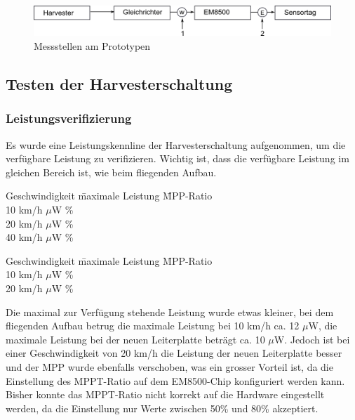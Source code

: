 \begin{figure}[ht]
  \includegraphics[width=1.0\textwidth]{3Vorgehen/imag/EnergiemessungStellen.png}               
  \caption{Messstellen am Prototypen}
  \label{EnergieMessungStellen} 
\end{figure}

\subsection{Testen der Harvesterschaltung}
\label{glace}

\subsubsection{Leistungsverifizierung}
\label{leistungsverifizierung}

Es wurde eine Leistungskennline der Harvesterschaltung aufgenommen, um die verfügbare Leistung zu verifizieren. Wichtig ist, dass die verfügbare Leistung im gleichen Bereich ist, wie beim fliegenden Aufbau. 

\begin{minipage}{1\textwidth}
\label{tab:leistung_fliegenden-aufbaus} 
\begin{tabbing}
    Geschwindigkeit   \quad\= maximale Leistung    \quad\= MPP-Ratio\\[0.8ex]
    10 km/h         $\mu$W   \%\\
	20 km/h         $\mu$W   \%\\
	40 km/h         $\mu$W   \%
\end{tabbing}
\end{minipage}

\label{tab:leistung_neuen_leiterplatte} 
\begin{tabbing}
    Geschwindigkeit   \quad\= maximale Leistung    \quad\= MPP-Ratio\\[0.8ex]
    10 km/h         $\mu$W   \%\\
	20 km/h         $\mu$W   \%
\end{tabbing}

Die maximal zur Verfügung stehende Leistung wurde etwas kleiner, bei dem fliegenden Aufbau betrug die maximale Leistung bei 10 km/h ca. 12 $\mu$W, die maximale Leistung bei der neuen Leiterplatte beträgt ca. 10 $\mu$W. Jedoch ist bei einer Geschwindigkeit von 20 km/h die Leistung der neuen Leiterplatte besser und der MPP wurde ebenfalls verschoben, was ein grosser Vorteil ist, da die Einstellung des MPPT-Ratio auf dem EM8500-Chip konfiguriert werden kann. Bisher konnte das MPPT-Ratio nicht korrekt auf die Hardware eingestellt werden, da die Einstellung nur Werte zwischen 50\thinspace\% und 80\thinspace\% akzeptiert.

